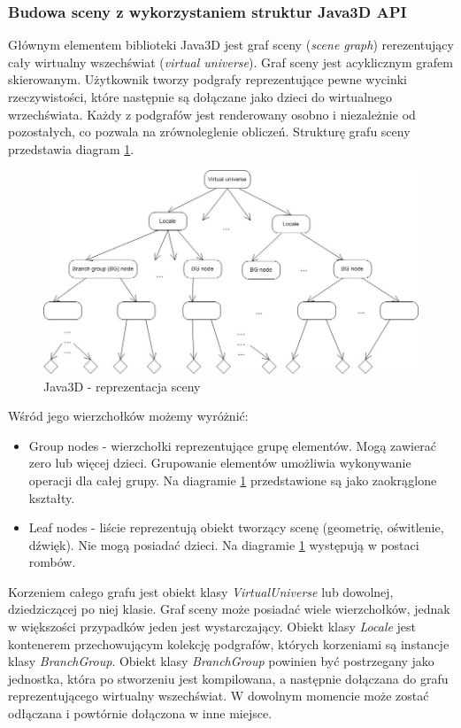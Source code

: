\subsubsection{Budowa sceny z wykorzystaniem struktur Java3D API}
Głównym elementem biblioteki Java3D jest graf sceny (\textit{scene graph}) rerezentujący cały wirtualny wszechświat (\textit{virtual universe}). Graf sceny jest acyklicznym grafem skierowanym.  Użytkownik tworzy podgrafy reprezentujące pewne wycinki rzeczywistości, które następnie są dołączane jako dzieci do wirtualnego wrzechświata. Każdy z podgrafów jest renderowany  osobno i niezależnie od pozostałych, co pozwala na zrównoleglenie obliczeń. Strukturę grafu sceny przedstawia diagram \ref{java3d_diagram_sceny}.
\begin{figure}
\begin {center}
\includegraphics[scale=0.75]{java3d_diagram_sceny.jpg} 
\caption {Java3D - reprezentacja sceny}
\label {java3d_diagram_sceny}
\end {center}
\end{figure}
 Wśród jego wierzchołków możemy wyróżnić:
\begin{itemize}
\item Group nodes - wierzchołki reprezentujące grupę elementów. Mogą zawierać zero lub więcej dzieci. Grupowanie elementów umożliwia wykonywanie operacji dla całej grupy. Na diagramie \ref{java3d_diagram_sceny} przedstawione są jako zaokrąglone kształty.
\item Leaf nodes - liście reprezentują obiekt tworzący scenę (geometrię, oświtlenie, dźwięk). Nie mogą posiadać dzieci. Na diagramie \ref{java3d_diagram_sceny} występują w postaci rombów.
\end{itemize}
Korzeniem całego grafu jest obiekt klasy \textit{VirtualUniverse} lub dowolnej, dziedziczącej po niej klasie. Graf sceny może posiadać wiele wierzchołków, jednak w większości przypadków jeden jest wystarczający. Obiekt klasy \textit{Locale} jest kontenerem przechowującym kolekcję podgrafów, których korzeniami są instancje klasy \textit {BranchGroup}. Obiekt klasy \textit{BranchGroup} powinien być postrzegany jako jednostka, która po stworzeniu jest kompilowana, a następnie dołączana do grafu reprezentującego wirtualny wszechświat. W dowolnym momencie może zostać odłączana i powtórnie dołączona w inne miejsce.
